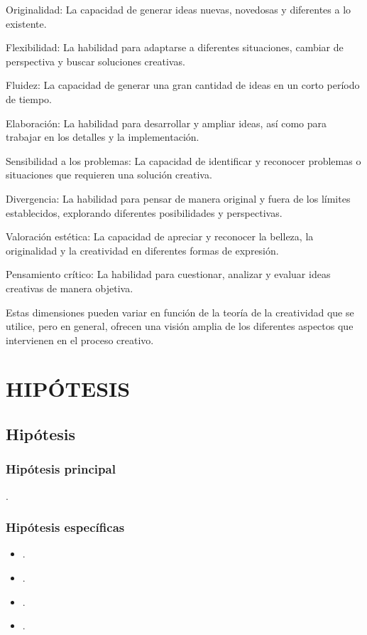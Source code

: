 \documentclass[12pt,a4paper]{article}
\begin{document}
Originalidad: La capacidad de generar ideas nuevas, novedosas y diferentes a lo existente.

Flexibilidad: La habilidad para adaptarse a diferentes situaciones, cambiar de perspectiva y buscar soluciones creativas.

Fluidez: La capacidad de generar una gran cantidad de ideas en un corto período de tiempo.

Elaboración: La habilidad para desarrollar y ampliar ideas, así como para trabajar en los detalles y la implementación.

Sensibilidad a los problemas: La capacidad de identificar y reconocer problemas o situaciones que requieren una solución creativa.

Divergencia: La habilidad para pensar de manera original y fuera de los límites establecidos, explorando diferentes posibilidades y perspectivas.

Valoración estética: La capacidad de apreciar y reconocer la belleza, la originalidad y la creatividad en diferentes formas de expresión.

Pensamiento crítico: La habilidad para cuestionar, analizar y evaluar ideas creativas de manera objetiva.

Estas dimensiones pueden variar en función de la teoría de la creatividad que se utilice, pero en general, ofrecen una visión amplia de los diferentes aspectos que intervienen en el proceso creativo.





\flushbottom \printglossary[numberedsection,nonumberlist,title=Definiciones  de términos básicos]




\section{HIPÓTESIS}
\subsection{Hipótesis}
\subsubsection{Hipótesis principal}
\hipotesis.
\subsubsection{Hipótesis específicas}
\begin{itemize}
	\item \hipotesise.
	\item \hipotesisee.
	\item \hipotesiseee.
	\item \hipotesiseeee.
\end{itemize}
\end{document}
